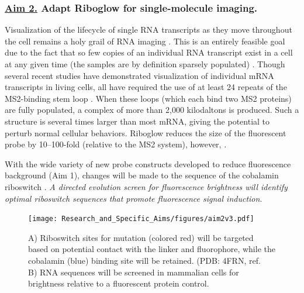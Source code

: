 \subsubsection*{\underline{Aim 2.} Adapt Riboglow for single-molecule imaging.}
Visualization of the lifecycle of single RNA transcripts as they move throughout the cell remains a holy grail of RNA imaging \cite{LiCentraldogmasinglemolecule2011}.
This is an entirely feasible goal due to the fact that so few copies of an individual RNA transcript exist in a cell at any given time (the samples are by definition sparsely populated) \cite{CabiliLocalizationabundanceanalysis2015,LiCentraldogmasinglemolecule2011,AndreckaSinglemoleculetrackingmRNA2008}.
Though several recent studies have demonstrated visualization of individual mRNA transcripts in living cells, all have required the use of at least 24 repeats of the MS2-binding stem loop \cite{KatzMappingtranslationhotspots2016,FuscoSinglemRNAMolecules2003,YamagishiSinglemoleculeimagingvactin2009,HalsteadRNAbiosensorimaging2015}.
When these loops (which each bind two MS2 proteins) are fully populated, a complex of more than 2,000 kilodaltons is produced.
Such a structure is several times larger than most mRNA, giving the potential to perturb normal cellular behaviors.
Riboglow reduces the size of the fluorescent probe by 10--100-fold (relative to the MS2 system), however, .

With the wide variety of new probe constructs developed to reduce fluorescence background (Aim 1), changes will be made to the sequence of the cobalamin riboswitch . \textit{A directed evolution screen for fluorescence brightness will identify optimal riboswitch sequences that promote fluorescence signal induction}.

\begin{figure}
\vspace{-0.25in} %
\begin{centering}
\texttt{[image: Research\_and\_Specific\_Aims/figures/aim2v3.pdf]}

\end{centering}
\footnotesize
\caption{\label{figure:aim2}
A) Riboswitch sites for mutation (colored red) will be targeted based on potential contact with the linker and fluorophore, while the cobalamin (blue) binding site will be retained. (PDB: 4FRN, ref.\ \cite{JohnsonJrB12cofactorsdirectly2012} B) RNA sequences will be screened in mammalian cells for brightness relative to a fluorescent protein control.
}
\end{figure}

